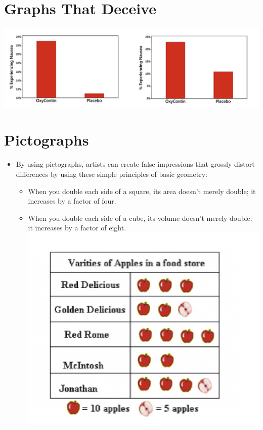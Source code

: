 \documentclass[]{book}
\providecommand{\tightlist}{%
  \setlength{\itemsep}{0pt}\setlength{\parskip}{0pt}}
\begin{document}
\hypertarget{graphs-that-deceive}{%
\section{Graphs That Deceive}\label{graphs-that-deceive}}

\includegraphics{wrong_graph_1.png}

\hypertarget{pictographs}{%
\section{Pictographs}\label{pictographs}}

\begin{itemize}
\tightlist
\item
  By using pictographs, artists can create false impressions that grossly distort differences by using these simple principles of basic geometry:

  \begin{itemize}
  \tightlist
  \item
    When you double each side of a square, its area doesn't merely double; it increases by a factor of four.
  \item
    When you double each side of a cube, its volume doesn't merely double; it increases by a factor of eight.
    \includegraphics{picto.png}
  \end{itemize}
\end{itemize}
\end{document}
